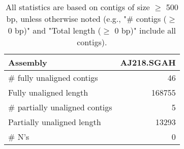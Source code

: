 \documentclass[12pt,a4paper]{article}
\begin{document}
\begin{table}[ht]
\begin{center}
\caption{All statistics are based on contigs of size $\geq$ 500 bp, unless otherwise noted (e.g., "\# contigs ($\geq$ 0 bp)" and "Total length ($\geq$ 0 bp)" include all contigs).}
\begin{tabular}{|l*{1}{|r}|}
\hline
Assembly & AJ218.SGAH \\ \hline
\# fully unaligned contigs & 46 \\ \hline
Fully unaligned length & 168755 \\ \hline
\# partially unaligned contigs & 5 \\ \hline
Partially unaligned length & 13293 \\ \hline
\# N's & 0 \\ \hline
\end{tabular}
\end{center}
\end{table}
\end{document}
